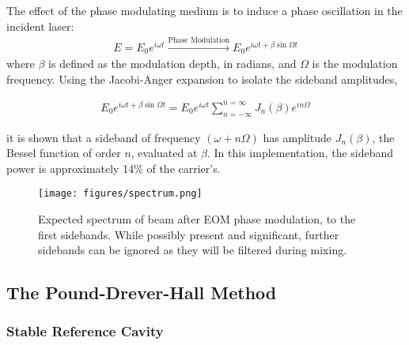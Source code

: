 The effect of the phase modulating medium is to induce a phase oscillation in the incident laser:
\begin{gather}
  E = E_0 e^{i\omega t} \xrightarrow{\mbox{Phase Modulation}}
    E_0 e^{i \omega t + \beta \sin \Omega t}
\end{gather}
where $\beta$ is defined as the modulation depth, in radians, and $\Omega$ is the modulation frequency. Using the Jacobi-Anger expansion to isolate the sideband amplitudes,

\begin{gather}
  E_0 e^{i \omega t + \beta \sin \Omega t}  =
  E_0 e^{i\omega t} \sum_{n = -\infty}^{n = \infty} J_n(\beta)e^{in\Omega}
\end{gather}

it is shown that a sideband of frequency $(\omega +n\Omega)$ has amplitude $J_n(\beta)$, the Bessel function of order $n$, evaluated at $\beta$. In this implementation, the sideband power is approximately 14\% of the carrier's.

\vfill

\begin{figure}
  \centering
  \texttt{[image: figures/spectrum.png]}
  \caption[Expected spectrum of beam after EOM phase modulation]{Expected spectrum of beam after EOM phase modulation, to the first sidebands. While possibly present and significant, further sidebands can be ignored as they will be filtered during mixing.}
  \label{fig:eom_spectrum}
\end{figure}


\subsection{The Pound-Drever-Hall Method}

\subsubsection{Stable Reference Cavity}

